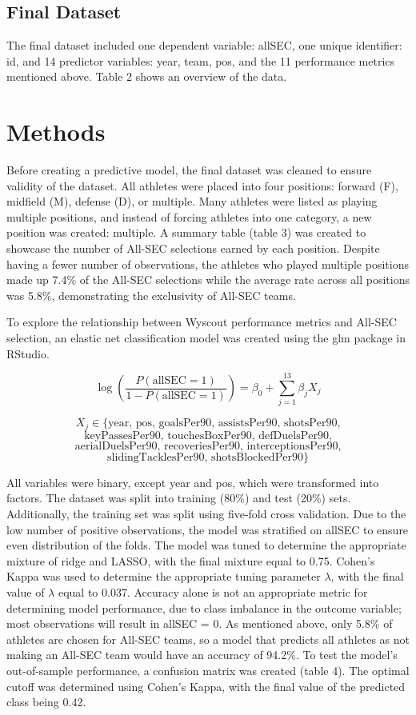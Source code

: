 \documentclass{article}
\begin{document}
\subsection{Final Dataset}
The final dataset included one dependent variable: allSEC, one unique identifier: id, and 14 predictor variables: year, team, pos, and the 11 performance metrics mentioned above. Table 2 shows an overview of the data.

\section{Methods}
Before creating a predictive model, the final dataset was cleaned to ensure validity of the dataset. All athletes were placed into four positions: forward (F), midfield (M), defense (D), or multiple. Many athletes were listed as playing multiple positions, and instead of forcing athletes into one category, a new position was created: multiple. A summary table (table 3) was created to showcase the number of All-SEC selections earned by each position. Despite having a fewer number of observations, the athletes who played multiple positions made up 7.4\% of the All-SEC selections while the average rate across all positions was 5.8\%, demonstrating the exclusivity of All-SEC teams. 

To explore the relationship between Wyscout performance metrics and All-SEC selection, an elastic net classification model was created using the glm package in RStudio. 

\[
\log\left(
\frac{P(\text{allSEC}=1)}
{1-P(\text{allSEC}=1)}
\right)
=
\beta_0
+
\sum_{j=1}^{13}\beta_j X_j
\]

{\footnotesize
\[
X_j \in \{\text{year, pos, goalsPer90, assistsPer90, shotsPer90,}
\]
\[
\text{keyPassesPer90, touchesBoxPer90, defDuelsPer90,}
\]
\[
\text{aerialDuelsPer90, recoveriesPer90, interceptionsPer90,}
\]
\[
\text{slidingTacklesPer90, shotsBlockedPer90}\}
\]
}

All variables were binary, except year and pos, which were transformed into factors. The dataset was split into training (80\%) and test (20\%) sets. Additionally, the training set was split using five-fold cross validation. Due to the low number of positive observations, the model was stratified on allSEC to ensure even distribution of the folds. The model was tuned to determine the appropriate mixture of ridge and LASSO, with the final mixture equal to 0.75. Cohen’s Kappa was used to determine the appropriate tuning parameter $\lambda$, with the final value of $\lambda$ equal to 0.037. Accuracy alone is not an appropriate metric for determining model performance, due to class imbalance in the outcome variable; most observations will result in allSEC = 0. As mentioned above, only 5.8\% of athletes are chosen for All-SEC teams, so a model that predicts all athletes as not making an All-SEC team would have an accuracy of 94.2\%.
To test the model’s out-of-sample performance, a confusion matrix was created (table 4). The optimal cutoff was determined using Cohen’s Kappa, with the final value of the predicted class being 0.42.
\end{document}
